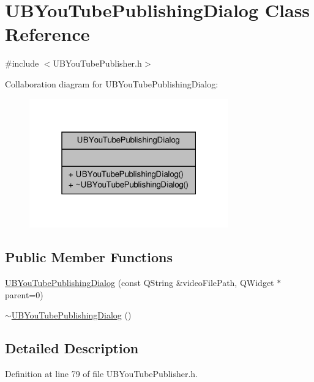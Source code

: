 \hypertarget{class_u_b_you_tube_publishing_dialog}{\section{U\-B\-You\-Tube\-Publishing\-Dialog Class Reference}
\label{db/d0d/class_u_b_you_tube_publishing_dialog}
}


{\ttfamily \#include $<$U\-B\-You\-Tube\-Publisher.\-h$>$}



Collaboration diagram for U\-B\-You\-Tube\-Publishing\-Dialog\-:
\nopagebreak
\begin{figure}[H]
\begin{center}
\leavevmode
\includegraphics[width=244pt]{dc/da0/class_u_b_you_tube_publishing_dialog__coll__graph}
\end{center}
\end{figure}
\subsection*{Public Member Functions}
\begin{DoxyCompactItemize}
\item 
\hyperlink{class_u_b_you_tube_publishing_dialog_a4c5dfc8806dec0c8dc305b66016d4607}{U\-B\-You\-Tube\-Publishing\-Dialog} (const Q\-String \&video\-File\-Path, Q\-Widget $\ast$parent=0)
\item 
\hyperlink{class_u_b_you_tube_publishing_dialog_aaba2cd35a4c148e9a021cbac7e0d8479}{$\sim$\-U\-B\-You\-Tube\-Publishing\-Dialog} ()
\end{DoxyCompactItemize}


\subsection{Detailed Description}


Definition at line 79 of file U\-B\-You\-Tube\-Publisher.\-h.



